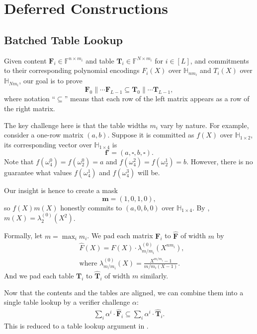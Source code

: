 \section{Deferred Constructions}\label{app:deferred-constructions}

\subsection{Batched Table Lookup}\label{app:concatenated-table-lookup}

Given content $\mathbf{F}_i\in \mathbb{F}^{n \times m_i}$
  and table $\mathbf{T}_i\in \mathbb{F}^{N\times m_i}$ for $i\in [L]$,
  and commitments to their corresponding polynomial encodings
  $F_i(X)$ over $\mathbb{H}_{n m_i}$
  and $T_i(X)$ over $\mathbb{H}_{N m_i}$,
  our goal is to prove
  \[
    \mathbf{F}_0\| \cdots \mathbf{F}_{L-1} \subseteq \mathbf{T}_0\| \cdots \mathbf{T}_{L-1},
  \]
  where notation ``$\subseteq$'' means
  that each row of the left matrix appears as a row of the right matrix.

The key challenge here is that the table widths $m_i$ vary
  by nature.
  For example, consider a one-row matrix $(a, b)$.
  Suppose it is committed as $f(X)$ over $\mathbb{H}_{1\times 2}$,
  its corresponding vector over $\mathbb{H}_{1\times 4}$ is
  \[
    \mathbf{f}' = (a, \square, b, \square).
  \]
  Note that $f(\omega_4^0) = f(\omega_2^0) = a$
  and $f(\omega_4^2) = f(\omega_2^1) = b$.
  However, there is no guarantee what values
  $f(\omega_4^1)$ and $f(\omega_4^3)$ will be.

Our insight is hence to create a mask
  \[
      \mathbf{m} = (1, 0, 1, 0),
  \]
  so $f(X)m(X)$ honestly commits to $(a, 0, b, 0)$ over $\mathbb{H}_{1\times 4}$.
  By , $m(X) = \lambda^{(0)}_2(X^2)$.

Formally, let $m = \max_i m_i$. We pad each matrix $\mathbf{F}_i$
  to $\widehat{\mathbf{F}}$ of width $m$ by
  \begin{align}
    & \widehat{F}(X) = F(X)\cdot \lambda^{(0)}_{m/m_i}(X^{nm_i}),\\
    & \text{where } \lambda^{(0)}_{m/m_i}(X) = \frac{X^{m/m_i} - 1}{m/m_i(X-1)}.
  \end{align}
  And we pad each table $\mathbf{T}_i$ to $\widehat{\mathbf{T}}_i$ of width $m$ similarly.

Now that the contents and the tables are aligned,
  we can combine them into a single table lookup by a verifier challenge $\alpha$:
  \begin{align}
    \sum_i \alpha^i\cdot \widehat{\mathbf{F}}_i \subseteq \sum_i \alpha^i\cdot \widehat{\mathbf{T}}_i.
  \end{align}
  This is reduced to a table lookup argument in \cite{cq++24}.


